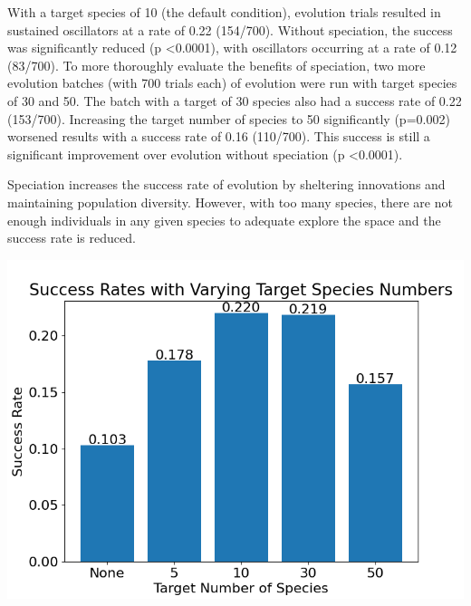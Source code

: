 \documentclass[12pt]{report}
\begin{document}
With a target species of 10 (the default condition), evolution trials resulted in sustained oscillators at a rate of 0.22 (154/700). Without speciation, the success was significantly reduced (p \textless 0.0001), with oscillators occurring at a rate of 0.12 (83/700). To more thoroughly evaluate the benefits of speciation, two more evolution batches (with 700 trials each) of evolution were run with target species of 30 and 50. The batch with a target of 30 species also had a success rate of 0.22 (153/700). Increasing the target number of species to 50 significantly (p=0.002) worsened results with a success rate of 0.16 (110/700). This success is still a significant improvement over evolution without speciation (p \textless 0.0001).

Speciation increases the success rate of evolution by sheltering innovations and maintaining population diversity. However, with too many species, there are not enough individuals in any given species to adequate explore the space and the success rate is reduced.

 
\begin{center}
    \includegraphics[width=15cm]{images/species_success_rate.png}
    \label{fig:species_success_rate}
\end{center}
\end{document}
